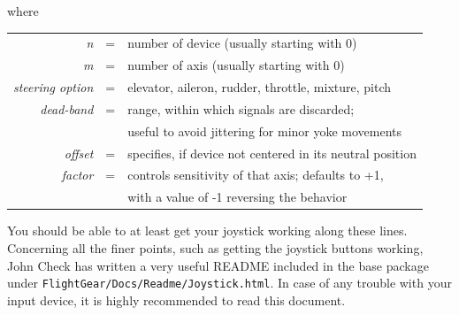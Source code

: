  \noindent
 where
 \medskip

\begin{tabular}{rcl}
 \textit{n} &=& number of device (usually starting with 0)\\
 \textit{m} &=& number of axis (usually starting with 0)\\
 \textit{steering option} &=& elevator, aileron, rudder, throttle, mixture, pitch\\
 \textit{dead-band} &=& range, within which signals are discarded;\\
                   && useful to avoid jittering for minor yoke movements\\
 \textit{offset} &=& specifies, if device not centered in its neutral position\\
  \textit{factor} &=& controls sensitivity of that axis; defaults to +1,\\
                 &&with a value of -1 reversing the behavior
  \end{tabular}
 \medskip

You should be able to at least get your joystick working along
these lines. Concerning all the finer points, such as getting the joystick buttons
working, John Check has written a very useful README  included in the base package under \texttt{FlightGear/Docs/Readme/Joystick.html}. In case of any trouble with your input device, it is highly recommended to read this document.


